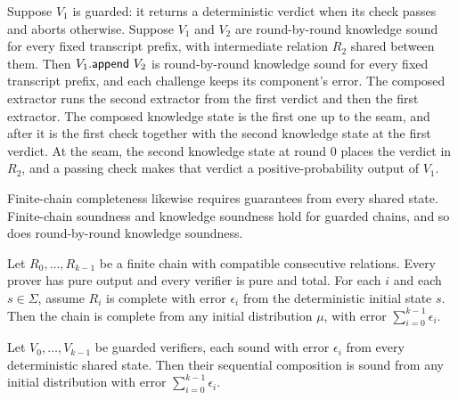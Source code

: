 \begin{theorem}
    \label{thm:rbr_knowledge_soundness_append_guarded}
    Suppose $V_1$ is guarded: it returns a deterministic verdict when its check passes and aborts
    otherwise. Suppose $V_1$ and $V_2$ are round-by-round knowledge sound for every fixed
    transcript prefix, with intermediate relation $R_2$ shared between them. Then
    $V_1.\append\ V_2$ is round-by-round knowledge sound for every fixed transcript prefix, and
    each challenge keeps its component's error. The composed extractor runs the second extractor
    from the first verdict and then the first extractor. The composed knowledge state is the first
    one up to the seam, and after it is the first check together with the second knowledge state at
    the first verdict. At the seam, the second knowledge state at round $0$ places the verdict in
    $R_2$, and a passing check makes that verdict a positive-probability output of $V_1$.
    \leanok
\end{theorem}

Finite-chain completeness likewise requires guarantees from every shared state.
Finite-chain soundness and knowledge soundness hold for guarded chains, and so does
round-by-round knowledge soundness.

\begin{theorem}
    \label{thm:completeness_compose}
    Let $R_0, \ldots, R_{k-1}$ be a finite chain with compatible consecutive relations.
    Every prover has pure output and every verifier is pure and total.
    For each $i$ and each $s \in \Sigma$, assume $R_i$ is complete with error $\epsilon_i$
    from the deterministic initial state $s$. Then the chain is complete from any initial
    distribution $\mu$, with error $\sum_{i=0}^{k-1} \epsilon_i$.
    \leanok
\end{theorem}

\begin{theorem}
    \label{thm:soundness_compose}
    Let $V_0, \ldots, V_{k-1}$ be guarded verifiers, each sound with error $\epsilon_i$ from every
    deterministic shared state. Then their sequential composition is sound from any initial
    distribution with error $\sum_{i=0}^{k-1} \epsilon_i$.
    \leanok
\end{theorem}

